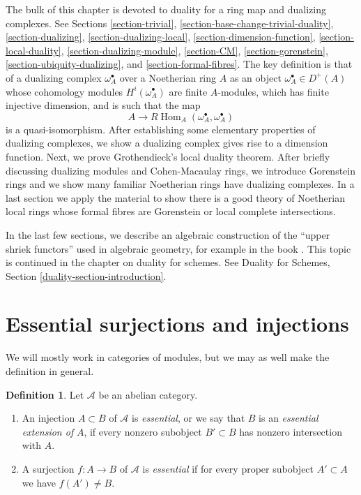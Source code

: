\documentclass{stacks-project}
\theoremstyle{plain}
\theoremstyle{definition}
\newtheorem{definition}[subsection]{Definition}
\theoremstyle{remark}
\numberwithin{equation}{subsection}
\def\Hom{\mathop{\mathrm{Hom}}\nolimits}
\begin{document}
\medskip\noindent
The bulk of this chapter is devoted to duality for a ring map and
dualizing complexes. See
Sections \ref{section-trivial},
\ref{section-base-change-trivial-duality},
\ref{section-dualizing},
\ref{section-dualizing-local},
\ref{section-dimension-function},
\ref{section-local-duality},
\ref{section-dualizing-module},
\ref{section-CM},
\ref{section-gorenstein},
\ref{section-ubiquity-dualizing}, and
\ref{section-formal-fibres}.
The key definition is that of a dualizing complex
$\omega_A^\bullet$ over a Noetherian ring $A$ as an object
$\omega_A^\bullet \in D^{+}(A)$ whose cohomology modules
$H^i(\omega_A^\bullet)$ are finite $A$-modules, which has
finite injective dimension, and is such that the map
$$
A \longrightarrow R\Hom_A(\omega_A^\bullet, \omega_A^\bullet)
$$
is a quasi-isomorphism. After establishing some elementary properties
of dualizing complexes, we show a dualizing complex gives rise to a
dimension function. Next, we prove Grothendieck's local duality theorem.
After briefly discussing dualizing modules and Cohen-Macaulay rings,
we introduce Gorenstein rings and we show many familiar Noetherian
rings have dualizing complexes. In a last section we apply the material
to show there is a good theory of Noetherian local rings whose formal fibres
are Gorenstein or local complete intersections.

\medskip\noindent
In the last few sections, we describe an algebraic construction of
the ``upper shriek functors'' used in algebraic geometry, for example
in the book \cite{RD}. This topic is continued in the chapter on
duality for schemes. See
Duality for Schemes, Section \ref{duality-section-introduction}.







\section{Essential surjections and injections}
\label{section-essential}

\noindent
We will mostly work in categories of modules, but we may as well make
the definition in general.

\begin{definition}
\label{definition-essential}
Let $\mathcal{A}$ be an abelian category.
\begin{enumerate}
\item An injection $A \subset B$ of $\mathcal{A}$ is {\it essential},
or we say that $B$ is an {\it essential extension of} $A$,
if every nonzero subobject $B' \subset B$ has nonzero intersection with $A$.
\item A surjection $f : A \to B$ of $\mathcal{A}$ is {\it essential}
if for every proper subobject $A' \subset A$ we have $f(A') \not = B$.
\end{enumerate}
\end{definition}
\end{document}
